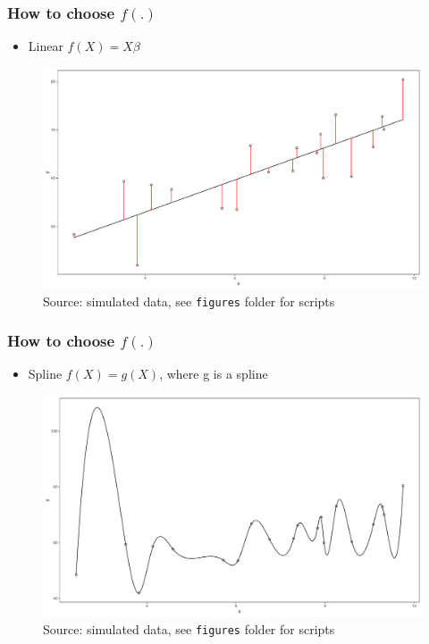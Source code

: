 \documentclass[
  shownotes,
  xcolor={svgnames},
  hyperref={colorlinks,citecolor=DarkBlue,linkcolor=DarkRed,urlcolor=DarkBlue}
  , aspectratio=169]{beamer}
\begin{document}
\begin{frame}
\frametitle{How to choose $f(.)$}


\begin{itemize}
  \item Linear $f(X)=X\beta$
\end{itemize}

\begin{figure}[H] \centering
  \centering
  \includegraphics[scale=0.25]{figures/fig_1b.pdf}
  \\
  \tiny
  Source: simulated data, see \texttt{figures} folder for scripts
\end{figure}


\end{frame}

\begin{frame}
\frametitle{How to choose $f(.)$}


\begin{itemize}
  \item Spline $f(X)=g(X)$, where g is a spline
\end{itemize}

\begin{figure}[H] \centering
  \centering
  \includegraphics[scale=0.25]{figures/fig_1c.pdf}
  \\
  \tiny
  Source: simulated data, see \texttt{figures} folder for scripts
\end{figure}
\end{frame}
\end{document}
